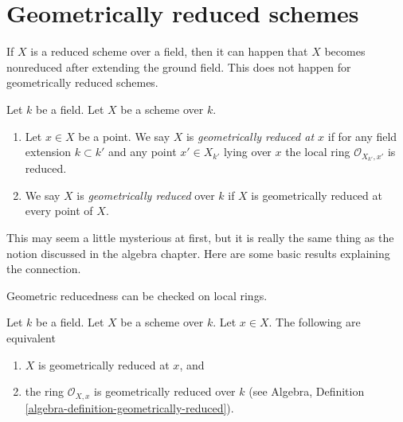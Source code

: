 \section{Geometrically reduced schemes}
\label{section-geometrically-reduced}

\noindent
If $X$ is a reduced scheme over a field, then it can happen that $X$
becomes nonreduced after extending the ground field. This does not happen
for geometrically reduced schemes.

\begin{definition}
\label{definition-geometrically-reduced}
Let $k$ be a field.
Let $X$ be a scheme over $k$.
\begin{enumerate}
\item Let $x \in X$ be a point.
We say $X$ is {\it geometrically reduced at $x$}
if for any field extension $k \subset k'$
and any point $x' \in X_{k'}$ lying over $x$
the local ring $\mathcal{O}_{X_{k'}, x'}$ is reduced.
\item We say $X$ is {\it geometrically reduced} over $k$
if $X$ is geometrically reduced at every point of $X$.
\end{enumerate}
\end{definition}

\noindent
This may seem a little mysterious at first, but it is
really the same thing as the notion discussed in the algebra chapter.
Here are some basic results explaining the connection.

\begin{lemma}
\label{lemma-geometrically-reduced-at-point}
\begin{slogan}
Geometric reducedness can be checked on local rings.
\end{slogan}
Let $k$ be a field.
Let $X$ be a scheme over $k$.
Let $x \in X$.
The following are equivalent
\begin{enumerate}
\item $X$ is geometrically reduced at $x$, and
\item the ring $\mathcal{O}_{X, x}$ is geometrically
reduced over $k$ (see
Algebra, Definition \ref{algebra-definition-geometrically-reduced}).
\end{enumerate}
\end{lemma}

